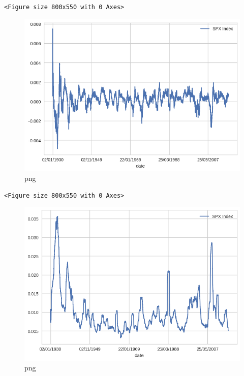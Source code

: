 \begin{lstlisting}
<Figure size 800x550 with 0 Axes>
\end{lstlisting}

\begin{figure}
\centering
\includegraphics{ProcessingStockPriceData_files/ProcessingStockPriceData_8_5.png}
\caption{png}
\end{figure}

\begin{lstlisting}
<Figure size 800x550 with 0 Axes>
\end{lstlisting}

\begin{figure}
\centering
\includegraphics{ProcessingStockPriceData_files/ProcessingStockPriceData_8_7.png}
\caption{png}
\end{figure}

